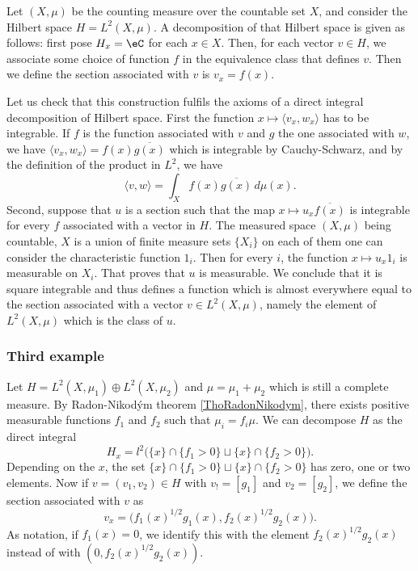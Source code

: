 Let $(X,\mu)$ be the counting measure over the countable set $X$, and consider the Hilbert space $H=L^2(X,\mu)$. A decomposition of that Hilbert space is given as follows: first pose $H_x=\eC$ for each $x\in X$. Then, for each vector $v\in H$, we associate some choice of function $f$ in the equivalence class that defines $v$. Then we define the section associated with $v$ is $v_x=f(x)$.

Let us check that this construction fulfils the axioms of a direct integral decomposition of Hilbert space. First the function $x\mapsto \langle v_x, w_x\rangle $ has to be integrable. If $f$ is the function associated with $v$ and $g$ the one associated with $w$, we have $\langle v_x, w_x\rangle =f(x)\overline{ g(x) }$ which is integrable by Cauchy-Schwarz, and by the definition of the product in $L^2$, we have
\begin{equation}
	\langle v, w\rangle =\int_X f(x)\overline{ g(x) }\,d\mu(x).
\end{equation}
Second, suppose that $u$ is a section such that the map $x\mapsto u_x\overline{ f(x) }$ is integrable for every $f$ associated with a vector in $H$. The measured space $(X,\mu)$ being countable, $X$ is a union of finite measure sets $\{ X_i \}$ on each of them one can consider the characteristic function $1_i$. Then for every $i$, the function $x\mapsto u_x 1_i$ is measurable on $X_i$. That proves that $u$ is measurable. We conclude that it is square integrable and thus defines a function which is almost everywhere equal to the section associated with a vector $v\in L^2(X,\mu)$, namely the element of $L^2(X,\mu)$ which is the class of $u$.

					\subsubsection{Third example}

Let $H=L^2(X,\mu_1)\oplus L^2(X,\mu_2)$ and $\mu=\mu_1+\mu_2$ which is still a complete measure. By Radon-Nikod\'ym theorem \ref{ThoRadonNikodym}, there exists positive measurable functions $f_1$ and $f_2$ such that $\mu_i=f_i\mu$. We can decompose $H$ as the direct integral
\begin{equation}
	H_x=l^2\Big(    \{ x \}\cap\{ f_1>0 \}\sqcup \{ x \}\cap\{ f_2>0 \}  \Big).
\end{equation}
Depending on the $x$, the set $\{ x \}\cap\{ f_1>0 \}\sqcup \{ x \}\cap\{ f_2>0 \}$ has zero, one or two elements. Now if $v=(v_1,v_2)\in H$ with $v_!=[g_1]$ and $v_2=[g_2]$, we define the section associated with $v$ as
\begin{equation}
	v_x=\big( f_1(x)^{1/2}g_1(x),f_2(x)^{1/2}g_2(x) \big).
\end{equation}
As notation, if $f_1(x)=0$, we identify this with the element $f_2(x)^{1/2}g_2(x)$ instead of with $(0,f_2(x)^{1/2}g_2(x))$.

